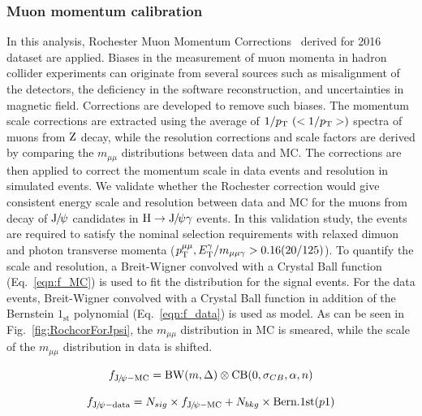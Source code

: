		\subsubsection{Muon momentum calibration}
		In this analysis, Rochester Muon Momentum Corrections~\cite{Bodek:2012id} derived for 2016 dataset are applied.
		Biases in the measurement of muon momenta in hadron collider experiments can originate from several sources such as misalignment of the detectors, the deficiency in the software reconstruction, and uncertainties in magnetic field. Corrections are developed to remove such biases. The momentum scale corrections are extracted using the average of $1/\pt \ (<1/\pt>)$ spectra of muons from $\mathrm{Z}$ decay, while the resolution corrections and scale factors are derived by comparing the $m_{\mu\mu}$ distributions between data and MC. The corrections are then applied to correct the momentum scale in data events and resolution in simulated events. 
		We validate whether the Rochester correction would give consistent energy scale and resolution between data and MC for the muons from decay of ${\mathrm{J}\hspace{-.08em}/\hspace{-.14em}\psi}$ candidates in $\mathrm{H}\to{\mathrm{J}\hspace{-.08em}/\hspace{-.14em}\psi}\gamma$ events. In this validation study, the events are required to satisfy the nominal selection requirements with relaxed dimuon and photon transverse momenta ($p_{\mathrm{T}}^{\mu\mu}, E_{\mathrm{T}}^{\gamma}/m_{\mu\mu\gamma} > 0.16(20/125)$). To quantify the scale and resolution, a Breit-Wigner convolved with a Crystal Ball function (Eq.~\ref{eqn:f_MC}) is used to fit the distribution for the signal events. For the data events, Breit-Wigner convolved with a Crystal Ball function in addition of the Bernstein $1_{\text{st}}$ polynomial (Eq.~\ref{eqn:f_data}) is used as model. As can be seen in Fig.~\ref{fig:RochcorForJpsi}, the $m_{\mu\mu}$ distribution in MC is smeared, while the scale of the $m_{\mu\mu}$ distribution in data is shifted. 
		
		\begin{equation}
		f_{{\mathrm{J}\hspace{-.08em}/\hspace{-.14em}\psi} - \text{MC}} = \text{BW}(m,\Delta)\otimes \text{CB}(0,\sigma_{CB},\alpha,n)
		\label{eqn:f_MC}
		\end{equation}
		
		\begin{equation}
		f_{{\mathrm{J}\hspace{-.08em}/\hspace{-.14em}\psi} - \text{data}} = N_{sig}\times f_{{\mathrm{J}\hspace{-.08em}/\hspace{-.14em}\psi} - \text{MC}} + N_{bkg}\times \text{Bern.1st}(p1) 
		\label{eqn:f_data}
		\end{equation}
		
